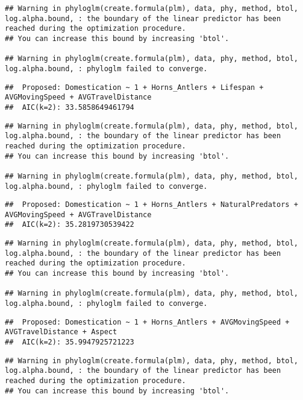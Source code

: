 \documentclass[
]{article}
\begin{document}
\begin{verbatim}
## Warning in phyloglm(create.formula(plm), data, phy, method, btol, log.alpha.bound, : the boundary of the linear predictor has been reached during the optimization procedure.
## You can increase this bound by increasing 'btol'.

## Warning in phyloglm(create.formula(plm), data, phy, method, btol, log.alpha.bound, : phyloglm failed to converge.
\end{verbatim}

\begin{verbatim}
##  Proposed: Domestication ~ 1 + Horns_Antlers + Lifespan + AVGMovingSpeed + AVGTravelDistance
##  AIC(k=2): 33.5858649461794
\end{verbatim}

\begin{verbatim}
## Warning in phyloglm(create.formula(plm), data, phy, method, btol, log.alpha.bound, : the boundary of the linear predictor has been reached during the optimization procedure.
## You can increase this bound by increasing 'btol'.

## Warning in phyloglm(create.formula(plm), data, phy, method, btol, log.alpha.bound, : phyloglm failed to converge.
\end{verbatim}

\begin{verbatim}
##  Proposed: Domestication ~ 1 + Horns_Antlers + NaturalPredators + AVGMovingSpeed + AVGTravelDistance
##  AIC(k=2): 35.2819730539422
\end{verbatim}

\begin{verbatim}
## Warning in phyloglm(create.formula(plm), data, phy, method, btol, log.alpha.bound, : the boundary of the linear predictor has been reached during the optimization procedure.
## You can increase this bound by increasing 'btol'.

## Warning in phyloglm(create.formula(plm), data, phy, method, btol, log.alpha.bound, : phyloglm failed to converge.
\end{verbatim}

\begin{verbatim}
##  Proposed: Domestication ~ 1 + Horns_Antlers + AVGMovingSpeed + AVGTravelDistance + Aspect
##  AIC(k=2): 35.9947925721223
\end{verbatim}

\begin{verbatim}
## Warning in phyloglm(create.formula(plm), data, phy, method, btol, log.alpha.bound, : the boundary of the linear predictor has been reached during the optimization procedure.
## You can increase this bound by increasing 'btol'.
\end{verbatim}
\end{document}
